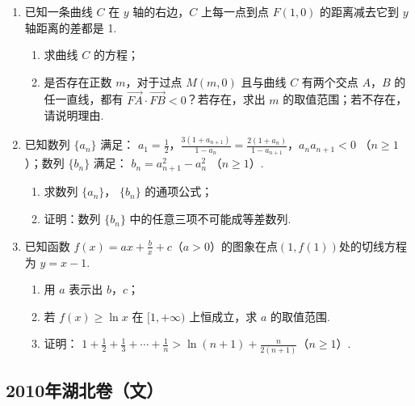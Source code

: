 \begin{description}
\begin{enumerate}[leftmargin=5pt]
        \item 已知一条曲线 \(C\) 在 \(y\) 轴的右边，\(C\) 上每一点到点 \(F(1,0)\) 的距离减去它到 \(y\) 轴距离的差都是 1.

\begin{enumerate}
\item 求曲线 \(C\) 的方程；
\item 是否存在正数 \(m\)，对于过点 \(M(m,0)\) 且与曲线 \(C\) 有两个交点 \(A\)，\(B\) 的任一直线，都有 \(\overrightarrow{FA} \cdot \overrightarrow{FB} < 0\)？若存在，求出 \(m\) 的取值范围；若不存在，请说明理由.
\end{enumerate}

        \item 已知数列 \(\{a_{n}\}\) 满足： \(a_1 = \frac{1}{2}\)，\(\frac{3(1 + a_{n + 1})}{1 - a_n} = \frac{2(1 + a_n)}{1 - a_{n + 1}}\)，\(a_n a_{n + 1} < 0\) （\(n \geqslant 1\)）；数列 \(\{b_n\}\) 满足： \(b_n = a_{n+1}^2 - a_n^2\) （\(n \geqslant 1\)）.

\begin{enumerate}
\item 求数列 \(\{a_{n}\}\)， \(\{b_{n}\}\) 的通项公式；
\item 证明：数列 \(\{b_n\}\) 中的任意三项不可能成等差数列.
\end{enumerate}

        \item 已知函数 \( f(x) = ax + \frac{b}{x} + c \)（\(a > 0\)）的图象在点\((1, f(1))\)处的切线方程为 \( y = x - 1 \).

\begin{enumerate}
\item 用 \(a\) 表示出 \(b\)，\(c\)；
\item 若 \( f(x) \geqslant \ln x \) 在 \([1, +\infty)\) 上恒成立，求 \(a\) 的取值范围.
\item 证明： \(1 + \frac{1}{2} + \frac{1}{3} + \cdots + \frac{1}{n} > \ln (n + 1) + \frac{n}{2(n + 1)}\)（\(n \geqslant 1\)）.
\end{enumerate}

    \end{enumerate}

\end{description}


\subsection{2010年湖北卷（文）}\label{gk:2010年湖北卷（文）}

